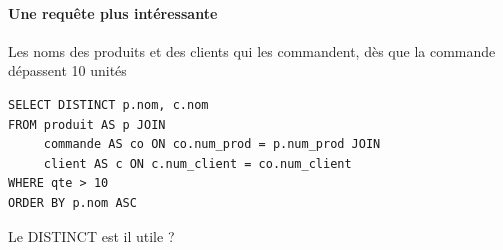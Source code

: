 \paragraph{Une requête plus intéressante} Les noms des produits et des clients qui les commandent, dès que la commande dépassent 10 unités

\begin{lstlisting}
SELECT DISTINCT p.nom, c.nom
FROM produit AS p JOIN
     commande AS co ON co.num_prod = p.num_prod JOIN
     client AS c ON c.num_client = co.num_client
WHERE qte > 10
ORDER BY p.nom ASC
\end{lstlisting}

\begin{rem}
	Le DISTINCT est il utile ?
\end{rem}